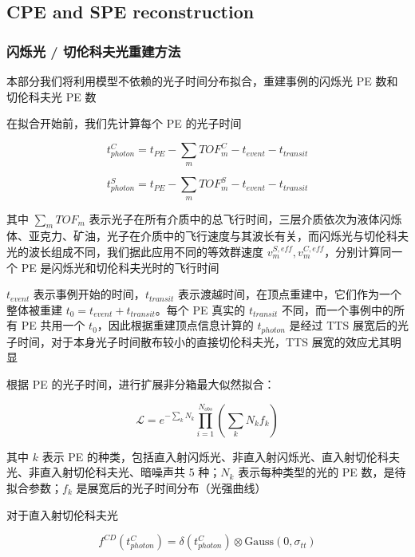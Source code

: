 \documentclass[12pt]{article}
\begin{document}
\subsection{CPE and SPE reconstruction}

\subsubsection{闪烁光 / 切伦科夫光重建方法}

本部分我们将利用模型不依赖的光子时间分布拟合，重建事例的闪烁光 PE 数和切伦科夫光 PE 数

在拟合开始前，我们先计算每个 PE 的光子时间

\begin{equation}
    t_{photon}^C = t_{PE} - \sum_{m} TOF_{m}^{C} - t_{event} - t_{transit}
\end{equation}
  
\begin{equation}
    t_{photon}^S = t_{PE} - \sum_{m} TOF_{m}^{S} - t_{event} - t_{transit}
\end{equation}

其中 $\sum_{m} TOF_{m}$ 表示光子在所有介质中的总飞行时间，三层介质依次为液体闪烁体、亚克力、矿油，光子在介质中的飞行速度与其波长有关，而闪烁光与切伦科夫光的波长组成不同，我们据此应用不同的等效群速度 $v_{m}^{S, eff}, v_{m}^{C, eff}$，分别计算同一个 PE 是闪烁光和切伦科夫光时的飞行时间

$t_{event}$ 表示事例开始的时间，$t_{transit}$ 表示渡越时间，在顶点重建中，它们作为一个整体被重建 $t_0 = t_{event} + t_{transit}$。每个 PE 真实的 $t_{transit}$ 不同，而一个事例中的所有 PE 共用一个 $t_0$，因此根据重建顶点信息计算的 $t_{photon}$ 是经过 TTS 展宽后的光子时间，对于本身光子时间散布较小的直接切伦科夫光，TTS 展宽的效应尤其明显

根据 PE 的光子时间，进行扩展非分箱最大似然拟合：

\begin{equation}
    \mathcal{L} = e^{- \sum_k N_k} \prod_{i=1}^{N_{obs}} \left( \sum_k N_k f_k \right)
    \label{equ:cs-fit}
\end{equation}

其中 $k$ 表示 PE 的种类，包括直入射闪烁光、非直入射闪烁光、直入射切伦科夫光、非直入射切伦科夫光、暗噪声共 5 种；$N_k$ 表示每种类型的光的 PE 数，是待拟合参数；$f_k$ 是展宽后的光子时间分布（光强曲线）

对于直入射切伦科夫光

\begin{equation}
    f^{CD} (t_{photon}^C) = \delta(t_{photon}^C) \otimes \mathrm{Gauss} (0, \sigma_{tt})
    \label{equ:chev-tpho}
\end{equation}
\end{document}

